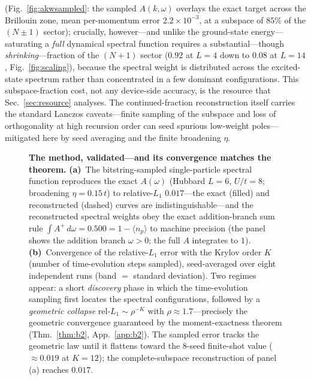 (Fig.~\ref{fig:akwsampled}: the sampled $A(k,\omega)$ overlays the exact target across the Brillouin
zone, mean per-momentum error $2.2\times10^{-3}$, at a subspace of $85\%$ of the $(N{\pm}1)$ sector);
crucially, however---and unlike the ground-state
energy---saturating a \emph{full} dynamical spectral function requires a substantial---though
\emph{shrinking}---fraction of the $(N{+}1)$ sector ($0.92$ at $L=4$ down to $0.08$ at $L=14$,
Fig.~\ref{fig:scaling}), because the spectral weight
is distributed across the excited-state spectrum rather than concentrated in a few dominant
configurations. This subspace-fraction cost, not any device-side accuracy, is the resource that
Sec.~\ref{sec:resource} analyses. The continued-fraction reconstruction itself carries the standard
Lanczos caveats---finite sampling of the subspace and loss of orthogonality at high recursion order can
seed spurious low-weight poles---mitigated here by seed averaging and the finite broadening $\eta$.

\begin{figure}[htbp]\centering
\caption{\textbf{The method, validated---and its convergence matches the theorem.} \textbf{(a)}~The
bitstring-sampled single-particle spectral function reproduces the exact $A(\omega)$ (Hubbard $L=6$,
$U/t=8$; broadening $\eta=0.15\,t$) to relative-$L_1$ $0.017$---the exact (filled) and reconstructed
(dashed) curves are indistinguishable---and the reconstructed spectral weights obey the exact addition-branch sum
rule $\int A^{+}\,d\omega=0.500=1-\langle n_p\rangle$ to machine precision (the panel shows the addition branch $\omega>0$; the full $A$ integrates to $1$). \textbf{(b)}~Convergence of the relative-$L_1$ error with
the Krylov order $K$ (number of time-evolution steps sampled), seed-averaged over eight independent
runs (band $=$ standard deviation). Two regimes appear: a short \emph{discovery} phase in which the
time-evolution sampling first locates the spectral configurations, followed by a \emph{geometric
collapse} $\text{rel-}L_1\sim\rho^{-K}$ with $\rho\approx1.7$---precisely the geometric convergence
guaranteed by the moment-exactness theorem (Thm.~\ref{thm:b2}, App.~\ref{app:b2}). The sampled error
tracks the geometric law until it flattens toward the $8$-seed finite-shot value ($\approx0.019$ at $K=12$); the
complete-subspace reconstruction of panel (a) reaches $0.017$.}\label{fig:method}\end{figure}


